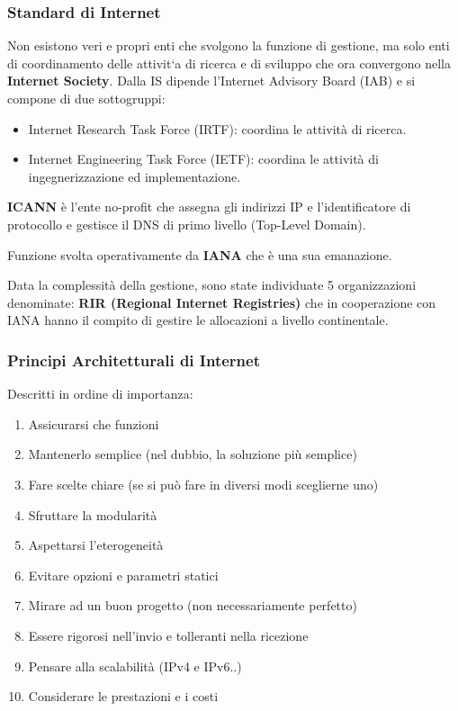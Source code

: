         \subsubsection{Standard di Internet}
            Non esistono veri e propri enti che svolgono la funzione di gestione, ma solo enti di coordinamento delle attivit`a di ricerca e di sviluppo che ora convergono nella \textbf{Internet Society}. Dalla IS dipende l'Internet Advisory Board (IAB) e si compone di due sottogruppi:
            \begin{itemize}
                \item Internet Research Task Force (IRTF): coordina le attività di ricerca.
                \item Internet Engineering Task Force (IETF): coordina le attività di ingegnerizzazione ed implementazione.
            \end{itemize}

            \textbf{ICANN} è l'ente no-profit che assegna gli indirizzi IP e l'identificatore di protocollo e gestisce il DNS di primo livello (Top-Level Domain).

            Funzione svolta operativamente da \textbf{IANA} che è una sua emanazione.

            Data la complessità della gestione, sono state individuate 5 organizzazioni denominate: \textbf{RIR (Regional Internet Registries)} che in cooperazione con IANA hanno il compito di gestire le allocazioni a livello continentale.

        \subsubsection{Principi Architetturali di Internet}
            Descritti in ordine di importanza:
            \begin{enumerate}
                \item Assicurarsi che funzioni
                \item Mantenerlo semplice (nel dubbio, la soluzione più semplice)
                \item Fare scelte chiare (se si può fare in diversi modi sceglierne uno) 
                \item Sfruttare la modularità
                \item Aspettarsi l'eterogeneità
                \item Evitare opzioni e parametri statici
                \item Mirare ad un buon progetto (non necessariamente perfetto)
                \item Essere rigorosi nell'invio e tolleranti nella ricezione
                \item Pensare alla scalabilità (IPv4 e IPv6..)
                \item Considerare le prestazioni e i costi
            \end{enumerate}
    

